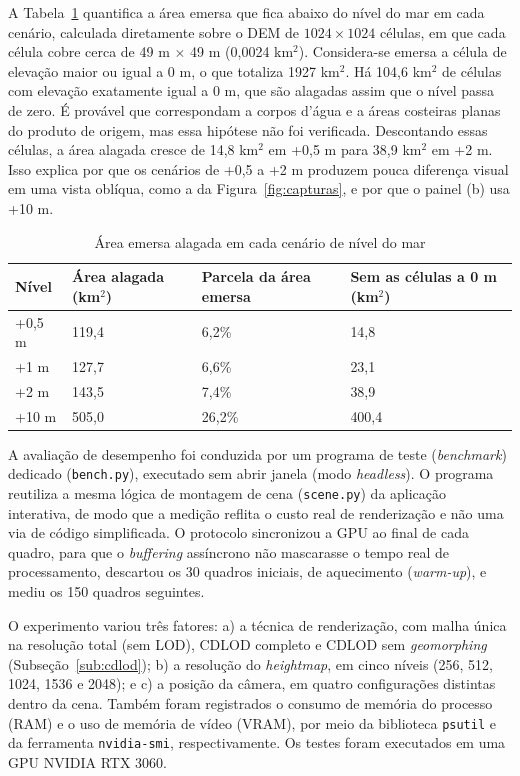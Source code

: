 \documentclass[conference]{IEEEtran}
\newcommand{\fonte}[1]{\par\vspace{2pt}{\footnotesize Fonte: #1\par}}
\begin{document}
A Tabela~\ref{tab:area} quantifica a área emersa que fica abaixo do nível
do mar em cada cenário, calculada diretamente sobre o DEM de $1024 \times
1024$ células, em que cada célula cobre cerca de 49 m $\times$ 49 m
(0,0024 km$^2$). Considera-se emersa a célula de elevação maior ou igual a
0 m, o que totaliza 1927 km$^2$. Há 104,6 km$^2$ de células com elevação
exatamente igual a 0 m, que são alagadas assim que o nível passa de zero.
É provável que correspondam a corpos d'água e a áreas costeiras planas do
produto de origem, mas essa hipótese não foi verificada. Descontando essas
células, a área alagada cresce de 14,8 km$^2$ em +0,5 m para 38,9 km$^2$ em
+2 m. Isso explica por que os cenários de +0,5 a +2 m produzem pouca
diferença visual em uma vista oblíqua, como a da Figura~\ref{fig:capturas},
e por que o painel (b) usa +10 m.

\begin{table}[t]
\caption{Área emersa alagada em cada cenário de nível do mar}
\label{tab:area}
\centering
\begin{tabular}{@{}p{1.3cm}p{1.9cm}p{2.0cm}p{2.3cm}@{}}
\toprule
\textbf{Nível} & \textbf{Área alagada (km$^2$)} & \textbf{Parcela da área emersa} & \textbf{Sem as células a 0 m (km$^2$)} \\
\midrule
+0,5 m & 119,4 & 6,2\% & 14,8 \\
+1 m   & 127,7 & 6,6\% & 23,1 \\
+2 m   & 143,5 & 7,4\% & 38,9 \\
+10 m  & 505,0 & 26,2\% & 400,4 \\
\bottomrule
\end{tabular}
\fonte{Elaborado pelos autores (2026), a partir do DEM de 1024 $\times$ 1024
células. Área emersa: células com elevação maior ou igual a 0 m (1927
km$^2$).}
\end{table}

A avaliação de desempenho foi conduzida por um programa de teste
(\emph{benchmark}) dedicado (\texttt{bench.py}), executado sem abrir janela
(modo \emph{headless}). O programa reutiliza a mesma lógica de montagem de
cena (\texttt{scene.py}) da aplicação interativa, de modo que a medição
reflita o custo real de renderização e não uma via de código simplificada.
O protocolo sincronizou a GPU ao final de cada quadro, para que o
\emph{buffering} assíncrono não mascarasse o tempo real de processamento,
descartou os 30 quadros iniciais, de aquecimento (\emph{warm-up}), e mediu
os 150 quadros seguintes.

O experimento variou três fatores: a) a técnica de renderização, com malha
única na resolução total (sem LOD), CDLOD completo e CDLOD sem
\emph{geomorphing} (Subseção~\ref{sub:cdlod}); b) a resolução do
\emph{heightmap}, em cinco níveis (256, 512, 1024, 1536 e 2048); e c) a
posição da câmera, em quatro configurações distintas dentro da cena. Também
foram registrados o consumo de memória do processo (RAM) e o uso de memória
de vídeo (VRAM), por meio da biblioteca \texttt{psutil} e da ferramenta
\texttt{nvidia-smi}, respectivamente. Os testes foram executados em uma
GPU NVIDIA RTX 3060.
\end{document}
